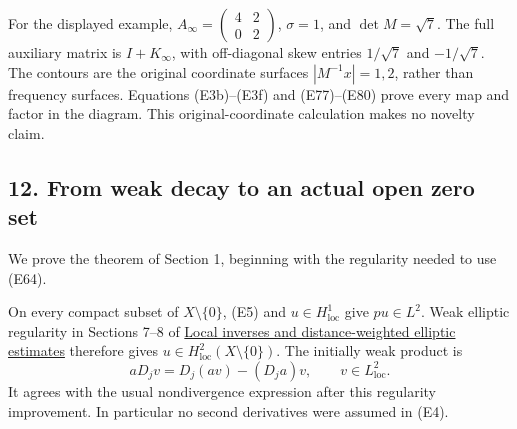\documentclass[
  11pt,
]{article}
\makeatletter
\let\ReaderOriginalAnchorStart\hyper@anchorstart
\let\ReaderOriginalAnchorEnd\hyper@anchorend
\let\ReaderPendingAliases\@empty
\def\ReaderArmAliases#1{\gdef\ReaderPendingAliases{#1}}
\def\hyper@anchorstart#1{\ReaderIfNativeAnchorTF{#1}{\ReaderPendingAliases\global\let\ReaderPendingAliases\@empty}{}\ReaderOriginalAnchorStart{#1}}
\makeatother
\begin{document}
For the displayed example,
\(A_\infty=\left(\begin{smallmatrix}4&2\\0&2\end{smallmatrix}\right)\),
\(\sigma=1\), and \(\det M=\sqrt7\). The full auxiliary matrix is
\(I+K_\infty\), with off-diagonal skew entries \(1/\sqrt7\) and
\(-1/\sqrt7\). The contours are the original coordinate surfaces
\(|M^{-1}x|=1,2\), rather than frequency surfaces. Equations
(E3b)--(E3f) and (E77)--(E80) prove every map and factor in the diagram.
This original-coordinate calculation makes no novelty claim.

\ReaderArmAliases{\ReaderOriginalAnchorStart{AN03-EXU-012}\ReaderOriginalAnchorEnd\begingroup\expandafter\def\csname @currentHref\endcsname{AN03-EXU-012}\label{AN03-EXU-012}\endgroup\ReaderOriginalAnchorStart{an03-exu-012-from-weak-decay-to-an-actual-open-zero-set}\ReaderOriginalAnchorEnd\begingroup\expandafter\def\csname @currentHref\endcsname{an03-exu-012-from-weak-decay-to-an-actual-open-zero-set}\label{an03-exu-012-from-weak-decay-to-an-actual-open-zero-set}\endgroup\ReaderOriginalAnchorStart{12-from-weak-decay-to-an-actual-open-zero-set}\ReaderOriginalAnchorEnd\begingroup\expandafter\def\csname @currentHref\endcsname{12-from-weak-decay-to-an-actual-open-zero-set}\label{12-from-weak-decay-to-an-actual-open-zero-set}\endgroup\ReaderOriginalAnchorStart{from-weak-decay-to-an-actual-open-zero-set}\ReaderOriginalAnchorEnd}
\subsection{12. From weak decay to an actual open zero
set}\label{from-weak-decay-to-an-actual-open-zero-set}

We prove the theorem of Section 1, beginning with the regularity needed
to use (E64).

On every compact subset of \(X\setminus\{0\}\), (E5) and
\(u\in H^1_{\mathrm{loc}}\) give \(pu\in L^2\). Weak elliptic regularity
in Sections 7--8 of \href{local-elliptic-coefficients.pdf}{Local inverses
and distance-weighted elliptic estimates} therefore gives
\(u\in H^2_{\mathrm{loc}}(X\setminus\{0\})\). The initially weak product
is \[
 aD_jv=D_j(av)-(D_ja)v,\qquad v\in L^2_{\mathrm{loc}}.
\] It agrees with the usual nondivergence expression after this
regularity improvement. In particular no second derivatives were assumed
in (E4).
\end{document}
